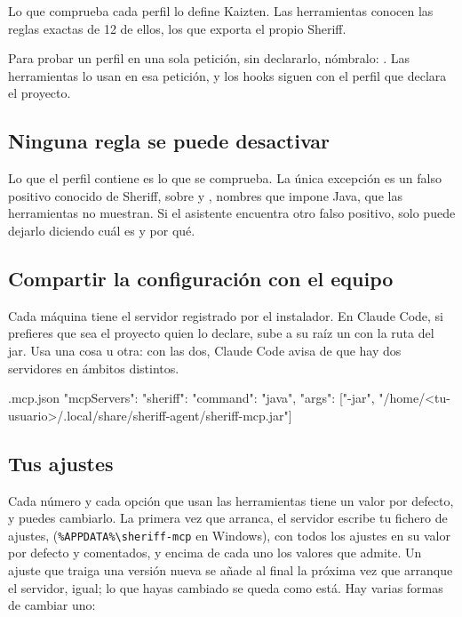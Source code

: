 \documentclass[11pt,a4paper]{article}
\begin{document}
Lo que comprueba cada perfil lo define Kaizten. Las herramientas conocen las
reglas exactas de 12 de ellos, los que exporta el propio Sheriff.

Para probar un perfil en una sola petición, sin declararlo, nómbralo:
. Las herramientas lo usan en esa
petición, y los hooks siguen con el perfil que declara el proyecto.

\subsection{Ninguna regla se puede desactivar}

Lo que el perfil contiene es lo que se comprueba. La única excepción es un falso
positivo conocido de Sheriff,  sobre
 y , nombres que impone Java, que
las herramientas no muestran. Si el asistente encuentra otro falso positivo, solo
puede dejarlo diciendo cuál es y por qué.

\subsection{Compartir la configuración con el equipo}

Cada máquina tiene el servidor registrado por el instalador. En Claude Code,
si prefieres que sea el proyecto quien lo declare, sube a su raíz un
 con la ruta del jar. Usa una cosa u otra: con las dos, Claude Code avisa de que hay dos
servidores  en ámbitos distintos.

\begin{command}[basicstyle=\ttfamily\footnotesize]{.mcp.json}
{
  "mcpServers": {
    "sheriff": {
      "command": "java",
      "args": ["-jar", "/home/<tu-usuario>/.local/share/sheriff-agent/sheriff-mcp.jar"]
    }
  }
}
\end{command}

\subsection{Tus ajustes}\label{sec:ajustes}

Cada número y cada opción que usan las herramientas tiene un valor por defecto, y
puedes cambiarlo. La primera vez que arranca, el servidor escribe tu fichero de
ajustes, \allowbreak{}
(\texttt{\%APPDATA\%\textbackslash sheriff-mcp} en Windows), con todos los ajustes
en su valor por defecto y comentados, y encima de cada uno los valores que
admite. Un ajuste que traiga una versión nueva se
añade al final la próxima vez que arranque el servidor, igual; lo que hayas
cambiado se queda como está. Hay varias formas de cambiar uno:
\end{document}

